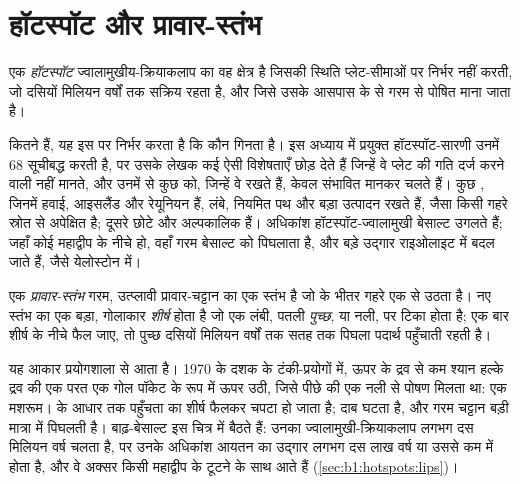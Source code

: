 \section{हॉटस्पॉट और प्रावार-स्तंभ}\label{sec:b1:hotspots:plumes}

\begin{definition}[हॉटस्पॉट]
\label{def:b1:hotspots:hotspot}
एक \emph{हॉटस्पॉट} ज्वालामुखीय-क्रियाकलाप का वह क्षेत्र है जिसकी स्थिति प्लेट-सीमाओं पर निर्भर नहीं करती, जो दसियों मिलियन वर्षों तक सक्रिय रहता है, और जिसे उसके आसपास के  से गरम  से पोषित माना जाता है।
\end{definition}

कितने  हैं, यह इस पर निर्भर करता है कि कौन गिनता है। इस अध्याय में प्रयुक्त हॉटस्पॉट-सारणी उनमें 68 सूचीबद्ध करती है, पर उसके लेखक कई ऐसी विशेषताएँ छोड़ देते हैं जिन्हें वे प्लेट की गति दर्ज करने वाली नहीं मानते, और उनमें से कुछ को, जिन्हें वे रखते हैं, केवल संभावित मानकर चलते हैं। कुछ , जिनमें हवाई, आइसलैंड और रेयूनियन हैं, लंबे, नियमित पथ और बड़ा उत्पादन रखते हैं, जैसा किसी गहरे स्रोत से अपेक्षित है; दूसरे छोटे और अल्पकालिक हैं। अधिकांश हॉटस्पॉट-ज्वालामुखी बेसाल्ट उगलते हैं; जहाँ कोई  महाद्वीप के नीचे हो, वहाँ गरम बेसाल्ट  को पिघलाता है, और बड़े उद्गार राइओलाइट में बदल जाते हैं, जैसे येलोस्टोन में।

\begin{definition}[प्रावार-स्तंभ]
\label{def:b1:hotspots:plume}
एक \emph{प्रावार-स्तंभ} गरम, उत्प्लावी प्रावार-चट्टान का एक स्तंभ है जो  के भीतर गहरे एक  से उठता है। नए स्तंभ का एक बड़ा, गोलाकार \emph{शीर्ष} होता है जो एक लंबी, पतली \emph{पुच्छ}, या नली, पर टिका होता है; एक बार शीर्ष  के नीचे फैल जाए, तो पुच्छ दसियों मिलियन वर्षों तक सतह तक पिघला पदार्थ पहुँचाती रहती है।
\end{definition}

यह आकार प्रयोगशाला से आता है। 1970 के दशक के टंकी-प्रयोगों में, ऊपर के द्रव से कम श्यान हल्के द्रव की एक परत एक गोल पॉकेट के रूप में ऊपर उठी, जिसे पीछे की एक नली से पोषण मिलता था: एक मशरूम।  के आधार तक पहुँचता  का शीर्ष फैलकर चपटा हो जाता है; दाब घटता है, और गरम चट्टान बड़ी मात्रा में पिघलती है। बाढ़-बेसाल्ट इस चित्र में बैठते हैं: उनका ज्वालामुखी-क्रियाकलाप लगभग दस मिलियन वर्ष चलता है, पर उनके अधिकांश आयतन का उद्गार लगभग दस लाख वर्ष या उससे कम में होता है, और वे अक्सर किसी महाद्वीप के टूटने के साथ आते हैं (\cref{sec:b1:hotspots:lips})।

